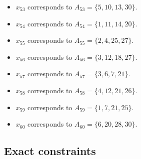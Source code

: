 \documentclass[11pt]{article}
\begin{document}
\begin{itemize}
\item $x_{53}$ corresponds to $A_{53}=\{5, 10, 13, 30\}$.
\item $x_{54}$ corresponds to $A_{54}=\{1, 11, 14, 20\}$.
\item $x_{55}$ corresponds to $A_{55}=\{2, 4, 25, 27\}$.
\item $x_{56}$ corresponds to $A_{56}=\{3, 12, 18, 27\}$.
\item $x_{57}$ corresponds to $A_{57}=\{3, 6, 7, 21\}$.
\item $x_{58}$ corresponds to $A_{58}=\{4, 12, 21, 26\}$.
\item $x_{59}$ corresponds to $A_{59}=\{1, 7, 21, 25\}$.
\item $x_{60}$ corresponds to $A_{60}=\{6, 20, 28, 30\}$.
\end{itemize}
\subsection*{Exact constraints}
\end{document}
